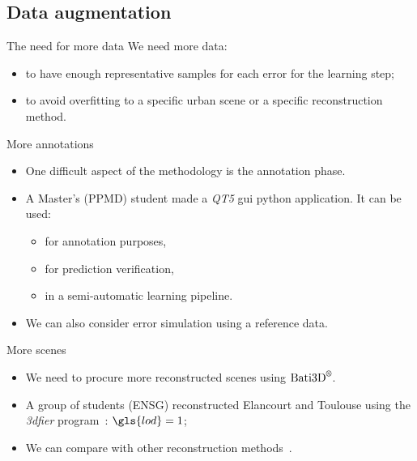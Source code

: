 \documentclass{beamer}
\begin{document}
        \subsection{Data augmentation}
            \begin{frame}{The need for more data}
                We need more data:
                \begin{itemize}[label=$\blacktriangleright$, font=\color{IGNGreen}]
                    \item to have enough representative samples for each error for the learning step;
                    \item to avoid overfitting to a specific urban scene or a specific reconstruction method.
                \end{itemize}
            \end{frame}
            \begin{frame}{More annotations}
                \begin{itemize}[label=$\blacktriangleright$, font=\color{IGNGreen}]
                    \item<1-> One difficult aspect of the methodology is the annotation phase.
                    \item<2-> A Master's (PPMD) student made a \emph{QT5} \acrshort{gui} python application. It can be used:
                    \begin{itemize}[label=--]
                        \item<3-> for annotation purposes,
                        \item<4-> for prediction verification,
                        \item<5-> in a semi-automatic learning pipeline.
                    \end{itemize}
                    \item<6-> We can also consider error simulation using a reference data.
                \end{itemize}
            \end{frame}
            \begin{frame}{More scenes}
                \begin{itemize}[label=$\blacktriangleright$, font=\color{IGNGreen}]
                    \item<1-> We need to procure more reconstructed scenes using $\text{Bati3D}^\text{\textregistered}$.
                    \item<2-> A group of students (ENSG) reconstructed Elancourt and Toulouse using the \emph{3dfier} program~: $\gls{lod} = 1$;
                    \item<3-> We can compare with other reconstruction methods~.
                \end{itemize}
            \end{frame}
\end{document}
